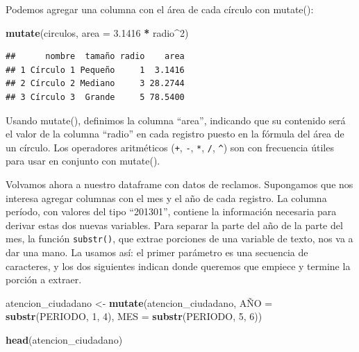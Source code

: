 \documentclass[spanish,]{book}
\newenvironment{Shaded}{\begin{snugshade}}{\end{snugshade}}
\newcommand{\DataTypeTok}[1]{\textcolor[rgb]{0.13,0.29,0.53}{#1}}
\newcommand{\DecValTok}[1]{\textcolor[rgb]{0.00,0.00,0.81}{#1}}
\newcommand{\FloatTok}[1]{\textcolor[rgb]{0.00,0.00,0.81}{#1}}
\newcommand{\KeywordTok}[1]{\textcolor[rgb]{0.13,0.29,0.53}{\textbf{#1}}}
\newcommand{\NormalTok}[1]{#1}
\newcommand{\OperatorTok}[1]{\textcolor[rgb]{0.81,0.36,0.00}{\textbf{#1}}}
\newcommand{\StringTok}[1]{\textcolor[rgb]{0.31,0.60,0.02}{#1}}
\begin{document}
Podemos agregar una columna con el área de cada círculo con mutate():

\begin{Shaded}
\begin{Highlighting}[]
\KeywordTok{mutate}\NormalTok{(circulos, }\DataTypeTok{area =} \FloatTok{3.1416} \OperatorTok{*}\StringTok{ }\NormalTok{radio}\OperatorTok{^}\DecValTok{2}\NormalTok{)}
\end{Highlighting}
\end{Shaded}

\begin{verbatim}
##      nombre  tamaño radio    area
## 1 Círculo 1 Pequeño     1  3.1416
## 2 Círculo 2 Mediano     3 28.2744
## 3 Círculo 3  Grande     5 78.5400
\end{verbatim}

Usando mutate(), definimos la columna ``area'', indicando que su contenido será el valor de la columna ``radio'' en cada registro puesto en la fórmula del área de un círculo. Los operadores aritméticos (\texttt{+}, \texttt{-}, \texttt{*}, \texttt{/}, \texttt{\^{}}) son con frecuencia útiles para usar en conjunto con mutate().

Volvamos ahora a nuestro dataframe con datos de reclamos. Supongamos que nos interesa agregar columnas con el mes y el año de cada registro. La columna período, con valores del tipo ``201301'', contiene la información necesaria para derivar estas dos nuevas variables. Para separar la parte del año de la parte del mes, la función \texttt{substr()}, que extrae porciones de una variable de texto, nos va a dar una mano. La usamos así: el primer parámetro es una secuencia de caracteres, y los dos siguientes indican donde queremos que empiece y termine la porción a extraer.

\begin{Shaded}
\begin{Highlighting}[]
\NormalTok{atencion_ciudadano <-}\StringTok{ }\KeywordTok{mutate}\NormalTok{(atencion_ciudadano,}
\NormalTok{                             AÑ}\DataTypeTok{O =} \KeywordTok{substr}\NormalTok{(PERIODO, }\DecValTok{1}\NormalTok{, }\DecValTok{4}\NormalTok{),}
                             \DataTypeTok{MES =} \KeywordTok{substr}\NormalTok{(PERIODO, }\DecValTok{5}\NormalTok{, }\DecValTok{6}\NormalTok{))}
                                
\KeywordTok{head}\NormalTok{(atencion_ciudadano) }
\end{Highlighting}
\end{Shaded}
\end{document}
